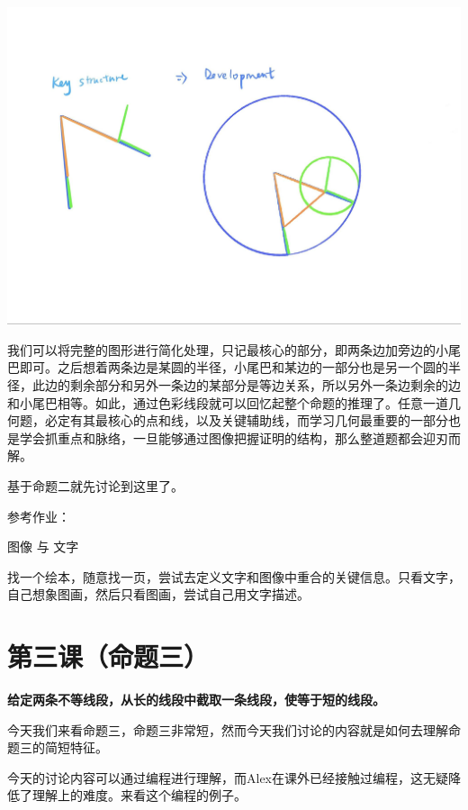 \documentclass[
]{book}
\begin{document}
\includegraphics[width=1\linewidth]{./image/02-prop2-image2}

我们可以将完整的图形进行简化处理，只记最核心的部分，即两条边加旁边的小尾巴即可。之后想着两条边是某圆的半径，小尾巴和某边的一部分也是另一个圆的半径，此边的剩余部分和另外一条边的某部分是等边关系，所以另外一条边剩余的边和小尾巴相等。如此，通过色彩线段就可以回忆起整个命题的推理了。任意一道几何题，必定有其最核心的点和线，以及关键辅助线，而学习几何最重要的一部分也是学会抓重点和脉络，一旦能够通过图像把握证明的结构，那么整道题都会迎刃而解。

基于命题二就先讨论到这里了。

参考作业：

图像 与 文字

找一个绘本，随意找一页，尝试去定义文字和图像中重合的关键信息。只看文字，自己想象图画，然后只看图画，尝试自己用文字描述。

\hypertarget{ux7b2cux4e09ux8bfeux547dux9898ux4e09}{%
\chapter{第三课（命题三）}\label{ux7b2cux4e09ux8bfeux547dux9898ux4e09}}

\textbf{给定两条不等线段，从长的线段中截取一条线段，使等于短的线段。}

今天我们来看命题三，命题三非常短，然而今天我们讨论的内容就是如何去理解命题三的简短特征。

今天的讨论内容可以通过编程进行理解，而Alex在课外已经接触过编程，这无疑降低了理解上的难度。来看这个编程的例子。
\end{document}
